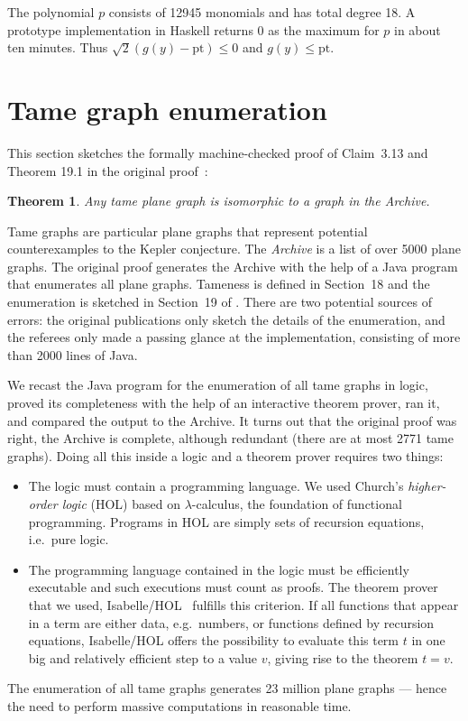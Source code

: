 \documentclass[11pt]{amsart}
\def\pt{\mathrm{pt}}
\newtheorem{thm}{Theorem}
\begin{document}
The polynomial $p$ consists of 12945 monomials and has total degree 18. A
prototype implementation in Haskell returns $0$ as the maximum for $p$ in about
ten minutes. Thus $\sqrt 2 (g(y) - \pt) \le 0$ and $g(y) \le \pt$.







\section{Tame graph enumeration}

\label{sec:graph}

This section sketches the formally machine-checked proof of Claim~3.13 and
Theorem 19.1 in the original proof~\cite{Hales:2006:DCG}:
\begin{thm}\label{Archive:complete}
Any tame plane graph is isomorphic to a graph in the Archive.
\end{thm}
Tame graphs are particular plane graphs that represent potential
counterexamples to the Kepler conjecture. The \emph{Archive} is a list of over 5000 plane
graphs.  The original proof generates the Archive with the help of a Java program that
enumerates all plane graphs. Tameness is defined
in Section~18 and the enumeration is sketched in Section~19 of
\cite{Hales:2006:DCG}. There are two potential sources of errors:
the original publications only sketch the details of the enumeration, and the
referees only made a passing glance at the implementation, consisting of more than 2000
lines of Java.

We recast the Java program for the enumeration of all tame graphs in
logic, proved its completeness with the help of an interactive theorem prover,
ran it, and compared the output to the
Archive.  It turns out that the original proof was right, the Archive is complete,
although redundant (there are at most 2771 tame graphs).
Doing all this inside a logic and a theorem prover requires two things:
\begin{itemize}
\item The logic must contain a programming language.
We used Church's \emph{higher-order logic} (HOL) based on $\lambda$-calculus,
the foundation of functional programming. Programs in HOL are simply
sets of recursion equations, i.e.\ pure logic.
\item The programming language contained in the logic must be efficiently
executable and such executions must count as proofs. The theorem prover that we used, Isabelle/HOL~\cite{LNCS2283} fulfills this criterion. If all functions
that appear in a term are either data, e.g.\ numbers, or functions defined
by recursion equations, Isabelle/HOL offers the possibility to evaluate this term $t$ in one big and relatively efficient step to a value $v$, giving rise to the theorem $t = v$.
\end{itemize}
The enumeration of all tame graphs generates 23 million plane graphs ---
hence the need to perform massive computations in reasonable time.
\end{document}
